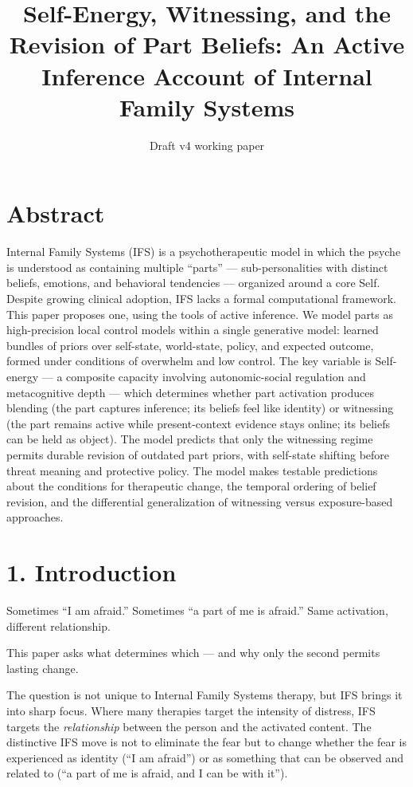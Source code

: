 \documentclass[11pt]{article}
\title{Self-Energy, Witnessing, and the Revision of Part Beliefs: An
Active Inference Account of Internal Family Systems}
\author{}
\date{Draft v4 working paper}
\begin{document}
\maketitle
\section{Abstract}\label{abstract}

Internal Family Systems (IFS) is a psychotherapeutic model in which the
psyche is understood as containing multiple ``parts'' ---
sub-personalities with distinct beliefs, emotions, and behavioral
tendencies --- organized around a core Self. Despite growing clinical
adoption, IFS lacks a formal computational framework. This paper
proposes one, using the tools of active inference. We model parts as
high-precision local control models within a single generative model:
learned bundles of priors over self-state, world-state, policy, and
expected outcome, formed under conditions of overwhelm and low control.
The key variable is Self-energy --- a composite capacity involving
autonomic-social regulation and metacognitive depth --- which determines
whether part activation produces blending (the part captures inference;
its beliefs feel like identity) or witnessing (the part remains active
while present-context evidence stays online; its beliefs can be held as
object). The model predicts that only the witnessing regime permits
durable revision of outdated part priors, with self-state shifting
before threat meaning and protective policy. The model makes testable
predictions about the conditions for therapeutic change, the temporal
ordering of belief revision, and the differential generalization of
witnessing versus exposure-based approaches.

\section{1. Introduction}\label{introduction}

Sometimes ``I am afraid.'' Sometimes ``a part of me is afraid.'' Same
activation, different relationship.

This paper asks what determines which --- and why only the second
permits lasting change.

The question is not unique to Internal Family Systems therapy, but IFS
brings it into sharp focus. Where many therapies target the intensity of
distress, IFS targets the \emph{relationship} between the person and the
activated content. The distinctive IFS move is not to eliminate the fear
but to change whether the fear is experienced as identity (``I am
afraid'') or as something that can be observed and related to (``a part
of me is afraid, and I can be with it'').
\end{document}
